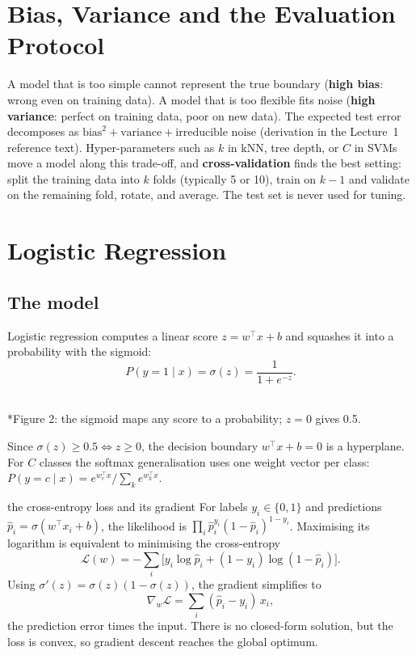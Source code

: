 \documentclass[11pt]{article}
\begin{document}
\section{Bias, Variance and the Evaluation Protocol}
A model that is too simple cannot represent the true boundary (\textbf{high bias}: wrong even on training data). A model that is too flexible fits noise (\textbf{high variance}: perfect on training data, poor on new data). The expected test error decomposes as $\text{bias}^2+\text{variance}+\text{irreducible noise}$ (derivation in the Lecture~1 reference text). Hyper-parameters such as $k$ in kNN, tree depth, or $C$ in SVMs move a model along this trade-off, and \textbf{cross-validation} finds the best setting: split the training data into $k$ folds (typically 5 or 10), train on $k-1$ and validate on the remaining fold, rotate, and average. The test set is never used for tuning.

\section{Logistic Regression}
\subsection{The model}
Logistic regression computes a linear score $z=w^\top x+b$ and squashes it into a probability with the sigmoid:
\[P(y=1\mid x)=\sigma(z)=\frac{1}{1+e^{-z}}.\]
\begin{center}\\*{\small\color{GreyN}Figure 2: the sigmoid maps any score to a probability; $z=0$ gives 0.5.}\end{center}
Since $\sigma(z)\ge0.5\iff z\ge0$, the decision boundary $w^\top x+b=0$ is a hyperplane. For $C$ classes the softmax generalisation uses one weight vector per class: $P(y=c\mid x)=e^{w_c^\top x}/\sum_ke^{w_k^\top x}$.

\begin{derivation}{the cross-entropy loss and its gradient}
For labels $y_i\in\{0,1\}$ and predictions $\hat p_i=\sigma(w^\top x_i+b)$, the likelihood is $\prod_i\hat p_i^{y_i}(1-\hat p_i)^{1-y_i}$. Maximising its logarithm is equivalent to minimising the cross-entropy
\[\mathcal L(w)=-\sum_i\big[y_i\log\hat p_i+(1-y_i)\log(1-\hat p_i)\big].\]
Using $\sigma'(z)=\sigma(z)(1-\sigma(z))$, the gradient simplifies to
\[\nabla_w\mathcal L=\sum_i(\hat p_i-y_i)\,x_i,\]
the prediction error times the input. There is no closed-form solution, but the loss is convex, so gradient descent reaches the global optimum.
\end{derivation}
\end{document}

